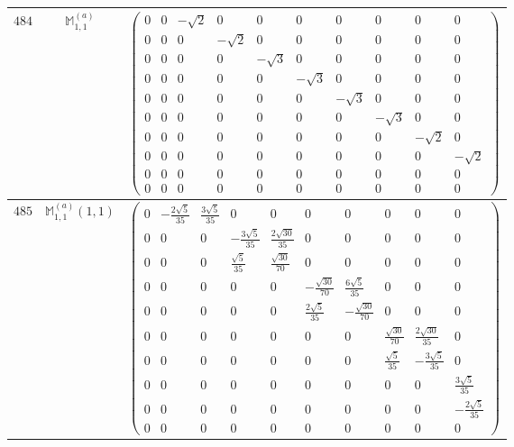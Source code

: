 \documentclass[fleqn,8pt,landscape]{jsarticle}
\begin{document}
\begin{center}
\begin{longtable}{ccc}
$ 484 $ & $ \mathbb{M}_{1,1}^{(a)} $ & $ \begin{pmatrix} 0 & 0 & - \sqrt{2} & 0 & 0 & 0 & 0 & 0 & 0 & 0 \\ 0 & 0 & 0 & - \sqrt{2} & 0 & 0 & 0 & 0 & 0 & 0 \\ 0 & 0 & 0 & 0 & - \sqrt{3} & 0 & 0 & 0 & 0 & 0 \\ 0 & 0 & 0 & 0 & 0 & - \sqrt{3} & 0 & 0 & 0 & 0 \\ 0 & 0 & 0 & 0 & 0 & 0 & - \sqrt{3} & 0 & 0 & 0 \\ 0 & 0 & 0 & 0 & 0 & 0 & 0 & - \sqrt{3} & 0 & 0 \\ 0 & 0 & 0 & 0 & 0 & 0 & 0 & 0 & - \sqrt{2} & 0 \\ 0 & 0 & 0 & 0 & 0 & 0 & 0 & 0 & 0 & - \sqrt{2} \\ 0 & 0 & 0 & 0 & 0 & 0 & 0 & 0 & 0 & 0 \\ 0 & 0 & 0 & 0 & 0 & 0 & 0 & 0 & 0 & 0 \end{pmatrix} $ \\ \hline
$ 485 $ & $ \mathbb{M}_{1,1}^{(a)}(1,1) $ & $ \begin{pmatrix} 0 & - \frac{2 \sqrt{5}}{35} & \frac{3 \sqrt{5}}{35} & 0 & 0 & 0 & 0 & 0 & 0 & 0 \\ 0 & 0 & 0 & - \frac{3 \sqrt{5}}{35} & \frac{2 \sqrt{30}}{35} & 0 & 0 & 0 & 0 & 0 \\ 0 & 0 & 0 & \frac{\sqrt{5}}{35} & \frac{\sqrt{30}}{70} & 0 & 0 & 0 & 0 & 0 \\ 0 & 0 & 0 & 0 & 0 & - \frac{\sqrt{30}}{70} & \frac{6 \sqrt{5}}{35} & 0 & 0 & 0 \\ 0 & 0 & 0 & 0 & 0 & \frac{2 \sqrt{5}}{35} & - \frac{\sqrt{30}}{70} & 0 & 0 & 0 \\ 0 & 0 & 0 & 0 & 0 & 0 & 0 & \frac{\sqrt{30}}{70} & \frac{2 \sqrt{30}}{35} & 0 \\ 0 & 0 & 0 & 0 & 0 & 0 & 0 & \frac{\sqrt{5}}{35} & - \frac{3 \sqrt{5}}{35} & 0 \\ 0 & 0 & 0 & 0 & 0 & 0 & 0 & 0 & 0 & \frac{3 \sqrt{5}}{35} \\ 0 & 0 & 0 & 0 & 0 & 0 & 0 & 0 & 0 & - \frac{2 \sqrt{5}}{35} \\ 0 & 0 & 0 & 0 & 0 & 0 & 0 & 0 & 0 & 0 \end{pmatrix} $ \\ \hline

\end{longtable}
\end{center}
\end{document}
